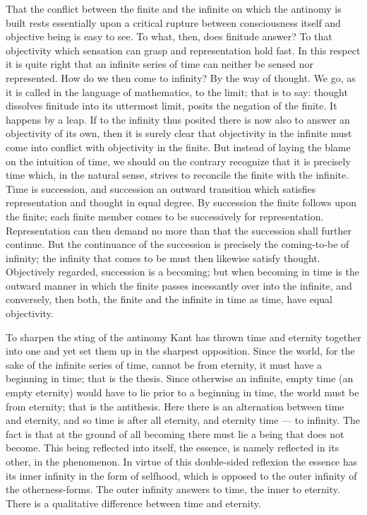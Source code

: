 \documentclass[12pt,a4paper]{book}
\begin{document}
That the conflict between the finite and the infinite on which the antinomy is
built rests essentially upon a critical rupture between consciousness itself and
objective being is easy to see. To what, then, does finitude answer? To that
objectivity which sensation can grasp and representation hold fast. In this
respect it is quite right that an infinite series of time can neither be sensed
nor represented. How do we then come to infinity? By the way of thought. We go, as
it is called in the language of mathematics, to the limit; that is to say: thought
dissolves finitude into its uttermost limit, posits the negation of the finite. It
happens by a leap. If to the infinity thus posited there is now also to answer an
objectivity of its own, then it is surely clear that objectivity in the infinite
must come into conflict with objectivity in the finite. But instead of laying the
blame on the intuition of time, we should on the contrary recognize that it is
precisely time which, in the natural sense, strives to reconcile the finite with
the infinite. Time is succession, and succession an outward transition which
satisfies representation and thought in equal degree. By succession the finite
follows upon the finite; each finite member comes to be successively for
representation. Representation can then demand no more than that the succession
shall further continue. But the continuance of the succession is precisely the
coming-to-be of infinity; the infinity that comes to be must then likewise satisfy
thought. Objectively regarded, succession is a becoming; but when becoming in time
is the outward manner in which the finite passes incessantly over into the
infinite,
and conversely, then both, the finite and the infinite in time as time, have equal
objectivity.

To sharpen the sting of the antinomy Kant has thrown time and eternity together
into one and yet set them up in the sharpest opposition. Since the world, for the
sake of the infinite series of time, cannot be from eternity, it must have a
beginning in time; that is the thesis. Since otherwise an infinite, empty time (an
empty eternity) would have to lie prior to a beginning in time, the world must be
from eternity; that is the antithesis. Here there is an alternation between time
and eternity, and so time is after all eternity, and eternity time --- to infinity.
The fact is that at the ground of all becoming there must lie a being that does not
become. This being reflected into itself, the essence, is namely reflected in its
other, in the phenomenon. In virtue of this double-sided reflexion the essence has
its inner infinity in the form of selfhood, which is opposed to the outer infinity
of the otherness-forms. The outer infinity answers to time, the inner to eternity.
There is a qualitative difference between time and eternity.
\end{document}
